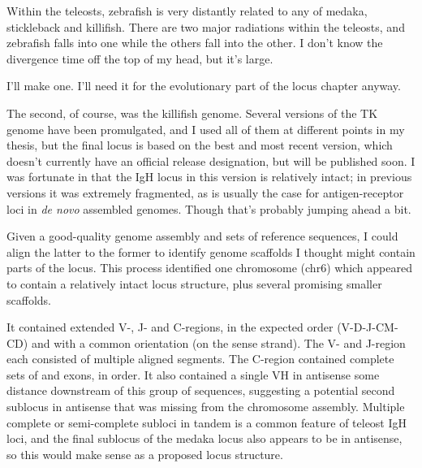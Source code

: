 Within the teleosts, zebrafish is very distantly related to any of medaka, stickleback and killifish. There are two major radiations within the teleosts, and zebrafish falls into one while the others fall into the other. I don't know the divergence time off the top of my head, but it's large.


I'll make one. I'll need it for the evolutionary part of the locus chapter anyway.


The second, of course, was the killifish genome. Several versions of the TK genome have been promulgated, and I used all of them at different points in my thesis, but the final locus is based on the best and most recent version, which doesn't currently have an official release designation, but will be published soon. I was fortunate in that the IgH locus in this version is relatively intact; in previous versions it was extremely fragmented, as is usually the case for antigen-receptor loci in \textit{de novo} assembled genomes. Though that's probably jumping ahead a bit.

Given a good-quality genome assembly and sets of reference sequences, I could align the latter to the former to identify genome scaffolds I thought might contain parts of the locus. This process identified one chromosome (chr6) which appeared to contain a relatively intact locus structure, plus several promising smaller scaffolds.


It contained extended V-, J- and C-regions, in the expected order (V-D-J-CM-CD) and with a common orientation (on the sense strand). The V- and J-region each consisted of multiple aligned segments. The C-region contained complete sets of \cm{} and \cd{} exons, in order. It also contained a single VH in antisense some distance downstream of this group of sequences, suggesting a potential second sublocus in antisense that was missing from the chromosome assembly. Multiple complete or semi-complete subloci in tandem is a common feature of teleost IgH loci, and the final sublocus of the medaka locus also appears to be in antisense, so this would make sense as a proposed locus structure.



